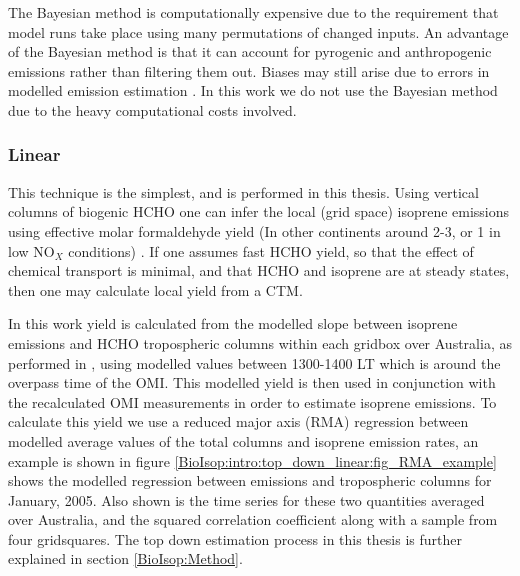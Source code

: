       The Bayesian method is computationally expensive due to the requirement that model runs take place using many permutations of changed inputs.
      An advantage of the Bayesian method is that it can account for pyrogenic and anthropogenic emissions rather than filtering them out.
      Biases may still arise due to errors in modelled emission estimation \parencite{Curci2010}.
      In this work we do not use the Bayesian method due to the heavy computational costs involved.
      
        
    
    \subsubsection{Linear}
      \label{BioIsop:intro:top_down_linear}
      
      This technique is the simplest, and is performed in this thesis.
      Using vertical columns of biogenic HCHO one can infer the local (grid space) isoprene emissions using effective molar formaldehyde yield (In other continents around 2-3, or 1 in low NO$_X$ conditions) \parencite{Palmer2003,Marais2012,Bauwens2016}.
      If one assumes fast HCHO yield, so that the effect of chemical transport is minimal, and that HCHO and isoprene are at steady states, then one may calculate local yield from a CTM.
      
      In this work yield is calculated from the modelled slope between isoprene emissions and HCHO tropospheric columns within each gridbox over Australia, as performed in \textcite{Palmer2003}, using modelled values between 1300-1400 LT which is around the overpass time of the OMI.
      This modelled yield is then used in conjunction with the recalculated OMI measurements in order to estimate isoprene emissions.
      To calculate this yield we use a reduced major axis (RMA) regression between modelled average values of the total columns and isoprene emission rates, an example is shown in figure \ref{BioIsop:intro:top_down_linear:fig_RMA_example} shows the modelled regression between emissions and tropospheric columns for January, 2005. Also shown is the time series for these two quantities averaged over Australia, and the squared correlation coefficient along with a sample from four gridsquares.
      The top down estimation process in this thesis is further explained in section \ref{BioIsop:Method}.
      
